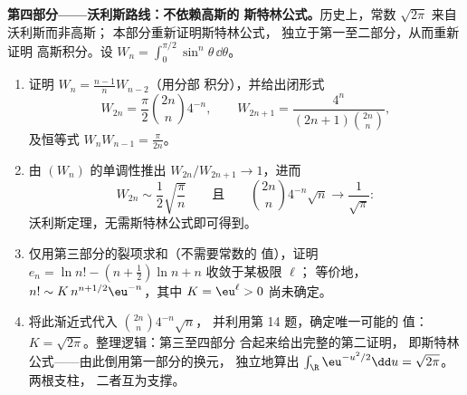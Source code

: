 \begin{problem}
\medskip
\noindent\textbf{第四部分——沃利斯路线：不依赖高斯的
斯特林公式。}历史上，常数 $\sqrt{2\pi}$ 来自沃利斯而非高斯；
本部分重新证明斯特林公式，
独立于第一至二部分，从而重新证明
高斯积分。设 $W_n = \int_0^{\pi/2}\sin^n\theta\,
\dd\theta$。
\begin{enumerate}[resume]
  \item 证明 $W_n = \frac{n-1}nW_{n-2}$（用分部
        积分），并给出闭形式
        \[
        W_{2n} = \frac\pi2\binom{2n}n4^{-n}, \qquad
        W_{2n+1} = \frac{4^n}{(2n+1)\binom{2n}n},
        \]
        及恒等式 $W_nW_{n-1} = \frac\pi{2n}$。
  \item 由 $(W_n)$ 的单调性推出
        $W_{2n}/W_{2n+1} \to 1$，进而
        \[
        W_{2n} \sim \frac12\sqrt{\frac\pi n}
        \qquad\text{且}\qquad
        \binom{2n}n4^{-n}\sqrt n \longrightarrow
        \frac1{\sqrt\pi} :
        \]
        沃利斯定理，无需斯特林公式即可得到。
  \item 仅用第三部分的裂项求和（不需要常数的
        值），证明 $e_n = \ln n! - (n +
        \frac12)\ln n + n$ 收敛于某极限 $\ell$；
        等价地，$n! \sim K\,n^{n+1/2}\eu^{-n}$，其中 $K =
        \eu^\ell > 0$ 尚未确定。
  \item 将此渐近式代入 $\binom{2n}n4^{-n}\sqrt n$，
        并利用第 14 题，确定唯一可能的
        值：$K = \sqrt{2\pi}$。整理逻辑：第三至四部分
        合起来给出完整的第二证明，
        即斯特林公式——由此倒用第一部分的换元，
        独立地算出
        $\int_\R\eu^{-u^2/2}\dd u = \sqrt{2\pi}$。两根支柱，
        二者互为支撑。
\end{enumerate}


\end{problem}
